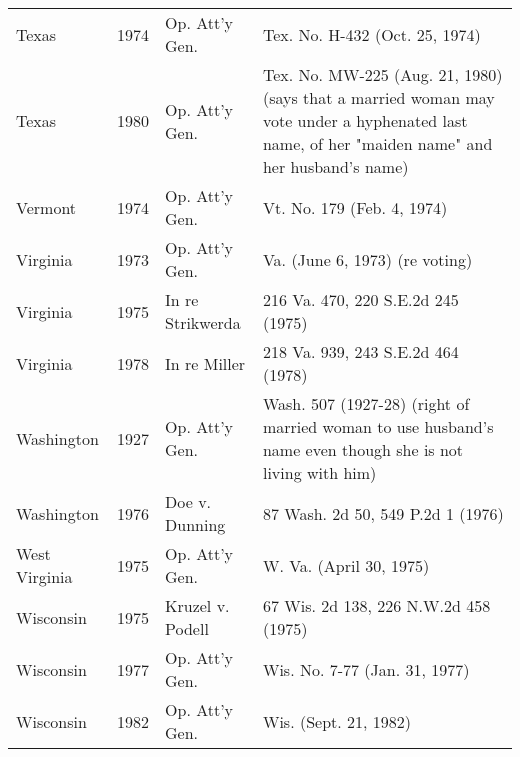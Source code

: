 \begin{longtable}{>{\hfill\footnotesize }p{2.5cm}<{}>{\footnotesize }p{0.75cm}<{}>{\footnotesize }p{4cm}<{}>{\footnotesize }p{6cm}<{}}
Texas & 1974 & Op. Att'y Gen. & Tex. No. H-432 (Oct. 25, 1974)\\\rowcolor{gray90}
Texas & 1980 & Op. Att'y Gen. & Tex. No. MW-225 (Aug. 21, 1980) (says that a married woman may vote under a hyphenated last name, of her "maiden name" and her husband's name)\\
Vermont & 1974 & Op. Att'y Gen. & Vt. No. 179 (Feb. 4, 1974)\\\rowcolor{gray90}
Virginia & 1973 & Op. Att'y Gen. & Va. (June 6, 1973) (re voting)\\
Virginia & 1975 & In re Strikwerda & 216 Va. 470, 220 S.E.2d 245 (1975)\\\rowcolor{gray90}
Virginia & 1978 & In re Miller & 218 Va. 939, 243 S.E.2d 464 (1978)\\
Washington & 1927 & Op. Att'y Gen. & Wash. 507 (1927-28) (right of married woman to use husband's name even though she is not living with him)\\\rowcolor{gray90}
Washington & 1976 & Doe v. Dunning & 87 Wash. 2d 50, 549 P.2d 1 (1976)\\
West Virginia & 1975 & Op. Att'y Gen. & W. Va. (April 30, 1975)\\\rowcolor{gray90}
Wisconsin & 1975 & Kruzel v. Podell & 67 Wis. 2d 138, 226 N.W.2d 458 (1975)\\
Wisconsin & 1977 & Op. Att'y Gen. & Wis. No. 7-77 (Jan. 31, 1977)\\\rowcolor{gray90}
Wisconsin & 1982 & Op. Att'y Gen. & Wis. (Sept. 21, 1982)\\
\end{longtable}
